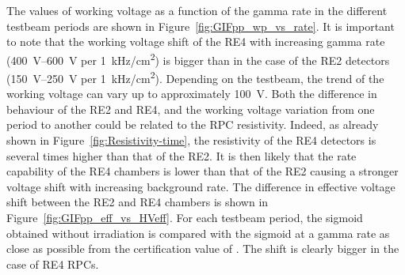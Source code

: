 	The values of working voltage as a function of the gamma rate in the different testbeam periods are shown in Figure~\ref{fig:GIFpp_wp_vs_rate}. It is important to note that the working voltage shift of the RE4 with increasing gamma rate (\SIrange{400}{600}{V} per \SI{1}{kHz/cm^2}) is bigger than in the case of the RE2 detectors (\SIrange{150}{250}{V} per \SI{1}{kHz/cm^2}). Depending on the testbeam, the trend of the working voltage can vary up to approximately \SI{100}{V}. Both the difference in behaviour of the RE2 and RE4, and the working voltage variation from one period to another could be related to the RPC resistivity. Indeed, as already shown in Figure~\ref{fig:Resistivity-time}, the resistivity of the RE4 detectors is several times higher than that of the RE2. It is then likely that the rate capability of the RE4 chambers is lower than that of the RE2 causing a stronger voltage shift with increasing background rate. The difference in effective voltage shift between the RE2 and RE4 chambers is shown in Figure~\ref{fig:GIFpp_eff_vs_HVeff}. For each testbeam period, the sigmoid obtained without irradiation is compared with the sigmoid at a gamma rate as close as possible from the certification value of . The shift is clearly bigger in the case of RE4 RPCs.\\
	
